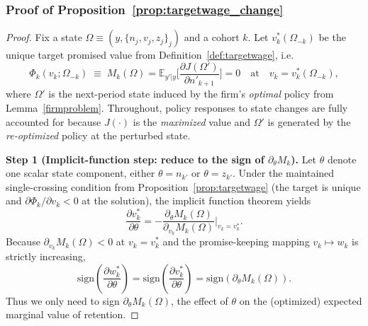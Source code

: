 
\subsubsection*{Proof of Proposition~\ref{prop:targetwage_change}} \label{proof:targetwage_change}
\begin{proof}
Fix a state $\Omega\equiv (y,\{n_j,v_j,z_j\}_j)$ and a cohort $k$.
Let $v_k^*(\Omega_{-k})$ be the unique target promised value from Definition~\ref{def:targetwage}, i.e.
\[
\Phi_k(v_k;\Omega_{-k}) \;\equiv\; M_k(\Omega)=
\mathbb E_{y'|y}\Big[\frac{\partial J(\Omega')}{\partial n'_{k+1}}\Big]=0
\quad\text{at}\quad v_k=v_k^*(\Omega_{-k}),
\]
where $\Omega'$ is the next-period state induced by the firm's \emph{optimal} policy from Lemma~\ref{firmproblem}.
Throughout, policy responses to state changes are fully accounted for because $J(\cdot)$ is the \emph{maximized} value
and $\Omega'$ is generated by the \emph{re-optimized} policy at the perturbed state.

\medskip
\noindent\textbf{Step 1 (Implicit-function step: reduce to the sign of $\partial_\theta M_k$).}
Let $\theta$ denote one scalar state component, either $\theta=n_{k'}$ or $\theta=z_{k'}$.
Under the maintained single-crossing condition from Proposition~\ref{prop:targetwage}
(the target is unique and $\partial \Phi_k/\partial v_k<0$ at the solution), the implicit function theorem yields
\begin{equation}\label{eq:IFT_change}
\frac{\partial v_k^*}{\partial \theta}
=
-\frac{\partial_\theta M_k(\Omega)}{\partial_{v_k} M_k(\Omega)}\bigg|_{v_k=v_k^*}.
\end{equation}
Because $\partial_{v_k}M_k(\Omega)<0$ at $v_k=v_k^*$ and the promise-keeping mapping $v_k\mapsto w_k$ is strictly increasing,
\[
\mathrm{sign}\!\left(\frac{\partial w_k^*}{\partial \theta}\right)
=
\mathrm{sign}\!\left(\frac{\partial v_k^*}{\partial \theta}\right)
=
\mathrm{sign}\!\left(\partial_\theta M_k(\Omega)\right).
\]
Thus we only need to sign $\partial_\theta M_k(\Omega)$, the effect of $\theta$ on the (optimized) expected marginal value of retention.


\end{proof}
